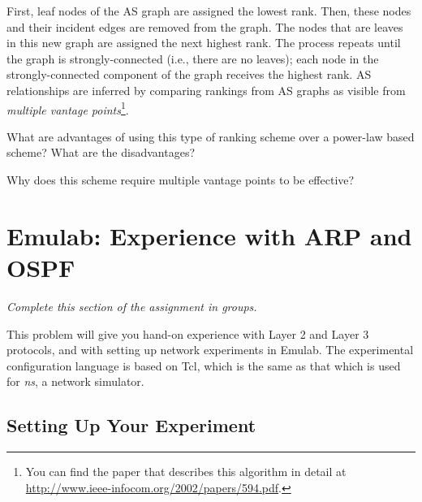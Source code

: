 \documentclass[11pt]{article}
\begin{document}
\begin{enumerate}
First, leaf nodes of the AS graph are assigned the lowest rank.  Then,
these nodes and their incident edges are removed from the graph.  The
nodes that are leaves in this new graph are assigned the next highest
rank.  The process repeats until the graph is strongly-connected (i.e.,
there are no leaves); each node in the strongly-connected component of
the graph receives the highest rank.  AS relationships are inferred by
comparing rankings from AS graphs as visible from {\em multiple vantage
points}\footnote{You can find the paper that describes this algorithm in
detail at \url{http://www.ieee-infocom.org/2002/papers/594.pdf}.}.

\setcounter{sublistcount}{0}
\begin{list}{()}{}
\item What are advantages of using this type of ranking scheme over a
power-law based scheme?  What are the disadvantages?
\item Why does this scheme require multiple vantage points to be
effective? 
\end{list}

\end{enumerate}


\section{Emulab: Experience with ARP and OSPF}

{\em Complete this section of the assignment in groups.}

This problem will give you hand-on experience with Layer 2 and Layer 3
protocols, and with setting up network experiments in Emulab.  The
experimental configuration language is based on Tcl, which is the same
as that which is used for {\em ns}, a network simulator.

\subsection*{Setting Up Your Experiment}
\end{document}
